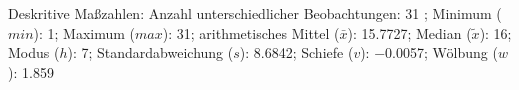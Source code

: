 				\label{tableValues:asys01a_o}
				\vspace*{-\baselineskip}
                    \begin{noten}
                	    \note{} Deskritive Maßzahlen:
                	    Anzahl unterschiedlicher Beobachtungen: 31%
                	    ; 
                	      Minimum ($min$): 1; 
                	      Maximum ($max$): 31; 
                	      arithmetisches Mittel ($\bar{x}$): \num[round-mode=places,round-precision=2]{15,7727}; 
                	      Median ($\tilde{x}$): 16; 
                	      Modus ($h$): 7; 
                	      Standardabweichung ($s$): \num[round-mode=places,round-precision=2]{8,6842}; 
                	      Schiefe ($v$): \num[round-mode=places,round-precision=2]{-0,0057}; 
                	      Wölbung ($w$): \num[round-mode=places,round-precision=2]{1,859}
                     \end{noten}


